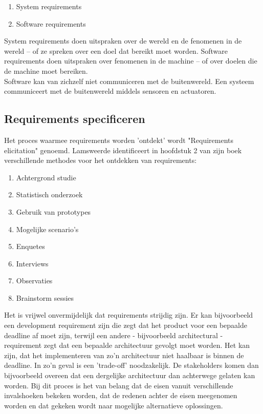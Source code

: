 \documentclass{article}
\begin{document}
	\begin{enumerate}
		\item System requirements
		\item Software requirements
	\end{enumerate}
	System requirements doen uitspraken over de wereld en de fenomenen in de wereld -- of ze spreken over een doel dat bereikt moet worden. Software requirements doen uitspraken over fenomenen in de machine -- of over doelen die de machine moet bereiken. \\
	Software kan van zichzelf niet communiceren met de buitenwereld. Een systeem communiceert met de buitenwereld middels sensoren en actuatoren. \par
		
		\subsection{Requirements specificeren}
		
		Het proces waarmee requirements worden 'ontdekt' wordt "Requirements elicitation" genoemd. Lamsweerde identificeert in hoofdstuk 2 van zijn boek verschillende methodes voor het ontdekken van requirements:

		\begin{enumerate}
			\item Achtergrond studie
			\item Statistisch onderzoek
			\item Gebruik van prototypes
			\item Mogelijke scenario's 
			\item Enquetes
			\item Interviews
			\item Observaties
			\item Brainstorm sessies
		\end{enumerate}
Het is vrijwel onvermijdelijk dat requirements strijdig zijn. Er kan bijvoorbeeld een development requirement zijn die zegt dat het product voor een bepaalde deadline af moet zijn, terwijl een andere - bijvoorbeeld architectural - requirement zegt dat een bepaalde architectuur gevolgt moet worden. Het kan zijn, dat het implementeren van zo'n architectuur niet haalbaar is binnen de deadline. In zo'n geval is een 'trade-off' noodzakelijk. De stakeholders komen dan bijvoorbeeld overeen dat een dergelijke architectuur dan achterwege gelaten kan worden. Bij dit proces is het van belang dat de eisen vanuit verschillende invalshoeken bekeken worden, dat de redenen achter de eisen meegenomen worden en dat gekeken wordt naar mogelijke alternatieve oplossingen.
		
\end{document}
